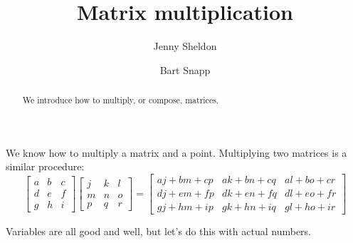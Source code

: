\documentclass{ximera}
\author{Jenny Sheldon \and Bart Snapp}
\title{Matrix multiplication}
\begin{document}
\begin{abstract}
  We introduce how to multiply, or compose, matrices.
\end{abstract}
\maketitle

We know how to multiply a matrix and a point. Multiplying two
matrices is a similar procedure:
\[
\begin{bmatrix}
a & b & c \\ 
d & e & f \\
g & h & i
\end{bmatrix}
\begin{bmatrix}
j & k & l \\ 
m & n & o \\
p & q & r
\end{bmatrix}
= \begin{bmatrix}
aj + bm + cp & ak + bn + cq & al + bo + cr \\
dj + em + fp & dk + en + fq & dl + eo + fr \\
gj + hm + ip & gk + hn + iq & gl + ho + ir 
\end{bmatrix}
\]

Variables are all good and well, but let's do this with actual
numbers.
\end{document}

